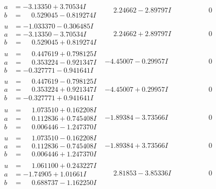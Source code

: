 \documentclass[1p]{elsarticle_modified}
\theoremstyle{definition}
\begin{document}
$$\begin{array}{c|c|c}
\begin{aligned}
a &= -3.13350 + 3.70534 I \\
b &= \phantom{-}0.529045 - 0.819274 I\end{aligned}
 & \phantom{-}2.24662 - 2.89797 I & \phantom{-0.000000 } 0 \\ \hline\begin{aligned}
u &= -1.033370 - 0.306485 I \\
a &= -3.13350 - 3.70534 I \\
b &= \phantom{-}0.529045 + 0.819274 I\end{aligned}
 & \phantom{-}2.24662 + 2.89797 I & \phantom{-0.000000 } 0 \\ \hline\begin{aligned}
u &= \phantom{-}0.447619 + 0.798125 I \\
a &= \phantom{-}0.353224 - 0.921347 I \\
b &= -0.327771 - 0.941641 I\end{aligned}
 & -4.45007 - 0.29957 I & \phantom{-0.000000 } 0 \\ \hline\begin{aligned}
u &= \phantom{-}0.447619 - 0.798125 I \\
a &= \phantom{-}0.353224 + 0.921347 I \\
b &= -0.327771 + 0.941641 I\end{aligned}
 & -4.45007 + 0.29957 I & \phantom{-0.000000 } 0 \\ \hline\begin{aligned}
u &= \phantom{-}1.073510 + 0.162208 I \\
a &= \phantom{-}0.112836 + 0.745408 I \\
b &= \phantom{-}0.006446 - 1.247370 I\end{aligned}
 & -1.89384 - 3.73566 I & \phantom{-0.000000 } 0 \\ \hline\begin{aligned}
u &= \phantom{-}1.073510 - 0.162208 I \\
a &= \phantom{-}0.112836 - 0.745408 I \\
b &= \phantom{-}0.006446 + 1.247370 I\end{aligned}
 & -1.89384 + 3.73566 I & \phantom{-0.000000 } 0 \\ \hline\begin{aligned}
u &= \phantom{-}1.061100 + 0.243227 I \\
a &= -1.74905 + 1.01661 I \\
b &= \phantom{-}0.688737 - 1.162250 I\end{aligned}
 & \phantom{-}2.81853 - 3.85336 I & \phantom{-0.000000 } 0 \\ \hline\begin{aligned}

\end{aligned}
\end{array}$$
\end{document}
